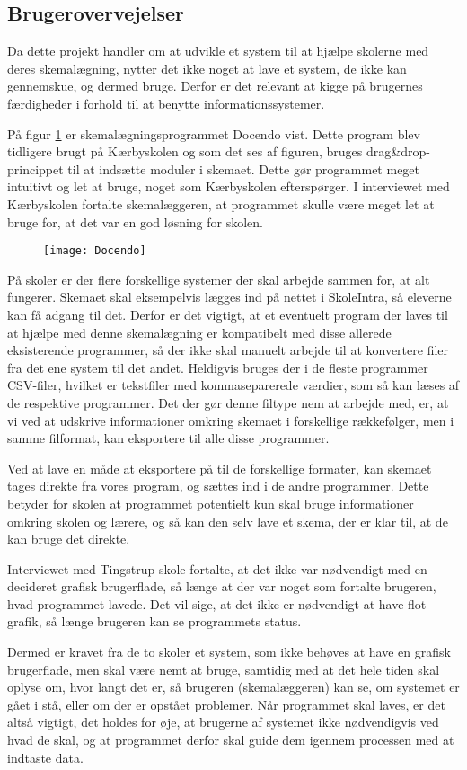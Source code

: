 \subsection{Brugerovervejelser}
Da dette projekt handler om at udvikle et system til at hjælpe skolerne med deres skemalægning, nytter det ikke noget at lave et system, de ikke kan gennemskue, og dermed bruge. Derfor er det relevant at kigge på brugernes færdigheder i forhold til at benytte informationssystemer.

På figur \ref{fig:docendo_skema} er skemalægningsprogrammet Docendo vist. Dette program blev tidligere brugt på Kærbyskolen og som det ses af figuren, bruges drag\&drop-princippet til at indsætte moduler i skemaet. Dette gør programmet meget intuitivt og let at bruge, noget som Kærbyskolen efterspørger. I interviewet med Kærbyskolen fortalte skemalæggeren, at programmet skulle være meget let at bruge for, at det var en god løsning for skolen.

\begin{figure}[h!]
	\centering
	\texttt{[image: Docendo]}
	\label{fig:docendo_skema}
\end{figure}

På skoler er der flere forskellige systemer der skal arbejde sammen for, at alt fungerer. Skemaet skal eksempelvis lægges ind på nettet i SkoleIntra, så eleverne kan få adgang til det. Derfor er det vigtigt, at et eventuelt program der laves til at hjælpe med denne skemalægning er kompatibelt med disse allerede eksisterende programmer, så der ikke skal manuelt arbejde til at konvertere filer fra det ene system til det andet. Heldigvis bruges der i de fleste programmer CSV-filer, hvilket er tekstfiler med kommaseparerede værdier, som så kan læses af de respektive programmer. Det der gør denne filtype nem at arbejde med, er, at vi ved at udskrive informationer omkring skemaet i forskellige rækkefølger, men i samme filformat, kan eksportere til alle disse programmer.

Ved at lave en måde at eksportere på til de forskellige formater, kan skemaet tages direkte fra vores program, og sættes ind i de andre programmer. Dette betyder for skolen at programmet potentielt kun skal bruge informationer omkring skolen og lærere, og så kan den selv lave et skema, der er klar til, at de kan bruge det direkte.

Interviewet med Tingstrup skole fortalte, at det ikke var nødvendigt med en decideret grafisk brugerflade, så længe at der var noget som fortalte brugeren, hvad programmet lavede. Det vil sige, at det ikke er nødvendigt at have flot grafik, så længe brugeren kan se programmets status. 

Dermed er kravet fra de to skoler et system, som ikke behøves at have en grafisk brugerflade, men skal være nemt at bruge, samtidig med at det hele tiden skal oplyse om, hvor langt det er, så brugeren (skemalæggeren) kan se, om systemet er gået i stå, eller om der er opstået problemer. Når programmet skal laves, er det altså vigtigt, det holdes for øje, at brugerne af systemet ikke nødvendigvis ved hvad de skal, og at programmet derfor skal guide dem igennem processen med at indtaste data.